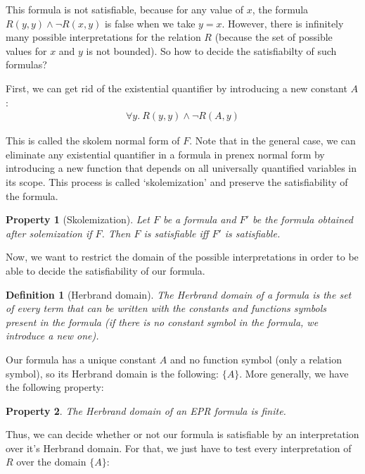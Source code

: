 \documentclass[11pt,a4paper,oldfontcommands]{memoir}
\newtheorem*{definition}{Definition}
\newtheorem*{property}{Property}
\begin{document}
        This formula is not satisfiable, because for any value of \(x\), the formula \(R(y,y) \land \neg R(x,y)\) is false when we take \(y=x\).
        However, there is infinitely many possible interpretations for the relation \(R\) (because the set of possible values for \(x\) and \(y\) is not bounded).
        So how to decide the satisfiabilty of such formulas?

        First, we can get rid of the existential quantifier by introducing a new constant \(A\):
        \begin{align*}
            \forall y. \ R(y,y) \land \neg R(A,y)
        \end{align*}

        This is called the skolem normal form of \(F\).
        Note that in the general case, we can eliminate any existential quantifier in a formula in prenex normal form by introducing a new function
        that depends on all universally quantified variables in its scope. This process is called `skolemization' and preserve the satisfiability of the formula.

        \begin{property}[Skolemization]
            Let \(F\) be a formula and \(F'\) be the formula obtained after solemization if \(F\). Then \(F\) is satisfiable iff \(F'\) is satisfiable.
        \end{property}

        Now, we want to restrict the domain of the possible interpretations in order to be able to decide the satisfiability of our formula.

        \begin{definition}[Herbrand domain]
            The Herbrand domain of a formula is the set of every term that can be written with the constants and functions symbols present in the formula
            (if there is no constant symbol in the formula, we introduce a new one).
        \end{definition}

        Our formula has a unique constant \(A\) and no function symbol (only a relation symbol), so its Herbrand domain is the following:
        \( \{A\} \). More generally, we have the following property:
        
        \begin{property}
        The Herbrand domain of an EPR formula is finite.
        \end{property}

        Thus, we can decide whether or not our formula is satisfiable by an interpretation over it's Herbrand domain.
        For that, we just have to test every interpretation of \(R\) over the domain \( \{A\} \):
\end{document}
